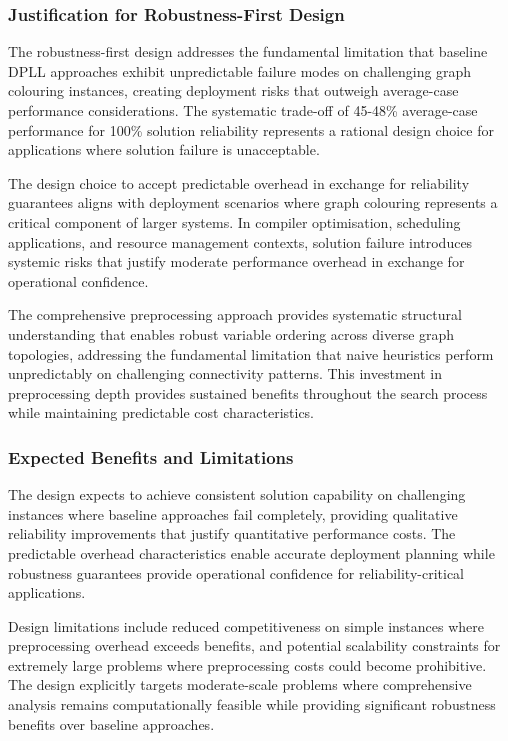 \subsubsection{Justification for Robustness-First Design}

The robustness-first design addresses the fundamental limitation that baseline DPLL approaches exhibit unpredictable failure modes on challenging graph colouring instances, creating deployment risks that outweigh average-case performance considerations. The systematic trade-off of 45-48\% average-case performance for 100\% solution reliability represents a rational design choice for applications where solution failure is unacceptable.

The design choice to accept predictable overhead in exchange for reliability guarantees aligns with deployment scenarios where graph colouring represents a critical component of larger systems. In compiler optimisation, scheduling applications, and resource management contexts, solution failure introduces systemic risks that justify moderate performance overhead in exchange for operational confidence.

The comprehensive preprocessing approach provides systematic structural understanding that enables robust variable ordering across diverse graph topologies, addressing the fundamental limitation that naive heuristics perform unpredictably on challenging connectivity patterns. This investment in preprocessing depth provides sustained benefits throughout the search process while maintaining predictable cost characteristics.

\subsubsection{Expected Benefits and Limitations}

The design expects to achieve consistent solution capability on challenging instances where baseline approaches fail completely, providing qualitative reliability improvements that justify quantitative performance costs. The predictable overhead characteristics enable accurate deployment planning while robustness guarantees provide operational confidence for reliability-critical applications.

Design limitations include reduced competitiveness on simple instances where preprocessing overhead exceeds benefits, and potential scalability constraints for extremely large problems where preprocessing costs could become prohibitive. The design explicitly targets moderate-scale problems where comprehensive analysis remains computationally feasible while providing significant robustness benefits over baseline approaches.